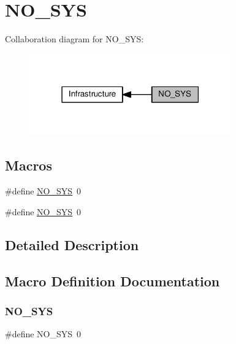 \hypertarget{group__lwip__opts__nosys}{}\section{N\+O\+\_\+\+S\+YS}
\label{group__lwip__opts__nosys}
Collaboration diagram for N\+O\+\_\+\+S\+YS\+:
\nopagebreak
\begin{figure}[H]
\begin{center}
\leavevmode
\includegraphics[width=247pt]{group__lwip__opts__nosys}
\end{center}
\end{figure}
\subsection*{Macros}
\begin{DoxyCompactItemize}
\item 
\#define \hyperlink{group__lwip__opts__nosys_gae00ba99de94a5bf84d832be8976df59b}{N\+O\+\_\+\+S\+YS}~0
\item 
\#define \hyperlink{group__lwip__opts__nosys_gae00ba99de94a5bf84d832be8976df59b}{N\+O\+\_\+\+S\+YS}~0
\end{DoxyCompactItemize}


\subsection{Detailed Description}


\subsection{Macro Definition Documentation}
\mbox{\label{group__lwip__opts__nosys_gae00ba99de94a5bf84d832be8976df59b}} 
\subsubsection{\texorpdfstring{N\+O\+\_\+\+S\+YS}{NO\_SYS}\hspace{0.1cm}{\footnotesize\ttfamily [1/2]}}
{\footnotesize\ttfamily \#define N\+O\+\_\+\+S\+YS~0}

